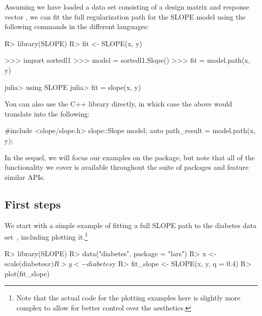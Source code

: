 \documentclass[article]{jss}
\begin{document}
Assuming we have loaded a data set consisting of a design matrix  and
response vector , we can fit the full regularization path for the SLOPE
model using the following commands in the different languages:

\begin{minipage}[t]{0.24\textwidth}%
  \textbf{}
  \begin{Code}
R> library(SLOPE)
R> fit <- SLOPE(x, y)
  \end{Code}
\end{minipage}
\hfill
\begin{minipage}[t]{0.33\textwidth}%
  \textbf{}
  \begin{Code}
>>> import sortedl1
>>> model = sortedl1.Slope()
>>> fit = model.path(x, y)
  \end{Code}
\end{minipage}
\hfill
\begin{minipage}[t]{0.32\textwidth}%
  \textbf{}
  \begin{Code}
julia> using SLOPE
julia> fit = slope(x, y)
  \end{Code}
\end{minipage}

\medskip

You can also use the C++ library directly, in
which case the above would translate into the
following:
\begin{Code}
#include <slope/slope.h>
slope::Slope model;
auto path_result = model.path(x, y);
\end{Code}

In the sequel, we will focus our examples on the  package, but
note that all of the functionality we cover is available throughout
the suite of packages and feature similar APIs.

\subsection{First steps}

We start with a simple example of fitting a full SLOPE path to the diabetes
data set~\citep{efron2004}, including plotting it.\footnote{Note that the
  actual code for the plotting examples here is slightly more complex to allow
  for better control over the aesthetics.}

\begin{Code}
R> library(SLOPE)
R> data("diabetes", package = "lars")
R> x <- scale(diabetes$x)
R> y <- diabetes$y
R> fit_slope <- SLOPE(x, y, q = 0.4)
R> plot(fit_slope)
\end{Code}
\end{document}
